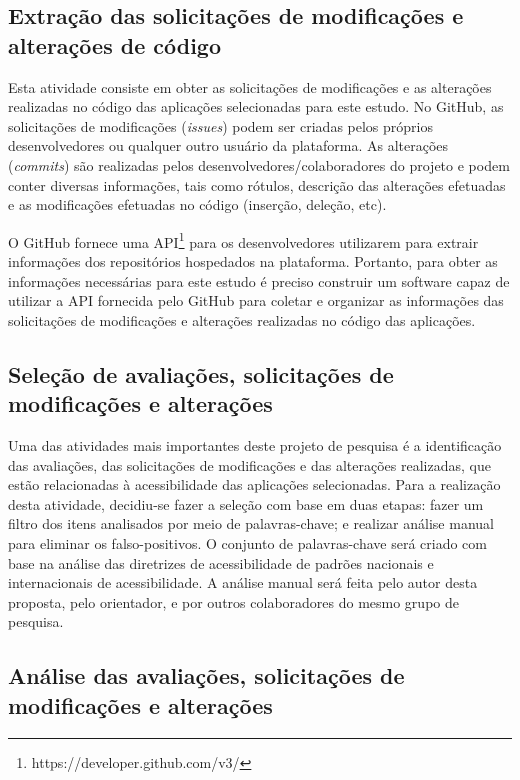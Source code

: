 \subsection{Extração das solicitações de modificações e alterações de código}
\label{sec:extracaomodificacoes}

Esta atividade consiste em obter as solicitações de modificações e as alterações realizadas no código das aplicações selecionadas para este estudo. 
No GitHub, as solicitações de modificações (\textit{issues}) podem ser criadas pelos próprios desenvolvedores ou qualquer outro usuário da plataforma.
As alterações (\textit{commits}) são realizadas pelos desenvolvedores/colaboradores do projeto e podem conter diversas informações, tais como rótulos, descrição das alterações efetuadas e as modificações efetuadas no código (inserção, deleção, etc). 

O GitHub fornece uma API\footnote{https://developer.github.com/v3/} para os desenvolvedores utilizarem para extrair informações dos repositórios hospedados na plataforma. Portanto, para obter as informações necessárias para este estudo é preciso construir um software capaz de utilizar a API fornecida pelo GitHub  para coletar e organizar as informações das solicitações de modificações e alterações realizadas no código das aplicações. 

\subsection{Seleção de avaliações, solicitações de modificações e alterações}
\label{sec:selecao}

Uma das atividades mais importantes deste projeto de pesquisa é a identificação das avaliações, das solicitações de modificações e das alterações realizadas, que estão relacionadas à acessibilidade das aplicações selecionadas.
Para a realização desta atividade, decidiu-se fazer a seleção com base em duas etapas: 
fazer um filtro dos itens analisados por meio de palavras-chave; e realizar análise manual para eliminar os falso-positivos. 
O conjunto de palavras-chave será criado com base na análise das diretrizes de acessibilidade de padrões nacionais e internacionais de acessibilidade.
A análise manual será feita pelo autor desta proposta, pelo orientador, e por outros colaboradores do mesmo grupo de pesquisa. 


\subsection{Análise das avaliações, solicitações de modificações e alterações}
\label{sec:analise}

